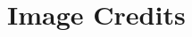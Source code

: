 

\label{m0054_Ch_End_Matter_Fundamentals_of_Electromagnetics} %

\onecolumn
\section*{Image Credits}

